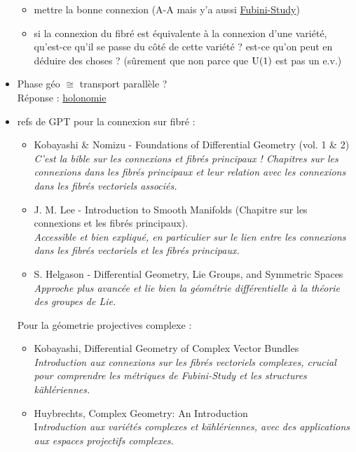 \begin{itemize}
\begin{itemize}
		\item mettre la bonne connexion (A-A mais y'a aussi  \href{https://en.wikipedia.org/wiki/Fubini%E2%80%93Study_metric}{Fubini-Study})
		
		\item si la connexion du fibré est équivalente à la connexion d'une variété, qu'est-ce qu'il se passe du côté de cette variété ? est-ce qu'on peut en déduire des choses ? (sûrement que non parce que $\text{\normalfont U}(1)$ est pas un e.v.)
	\end{itemize} 
	
	\item Phase géo $\cong$ transport parallèle ?
	\\ Réponse :
	\href{https://fr.wikipedia.org/wiki/Holonomie}{holonomie}
	
	\item refs de GPT pour la connexion sur fibré :
	\begin{itemize}
		\item Kobayashi \& Nomizu - Foundations of Differential Geometry (vol. 1 \& 2)
		\\
		\textit{C'est la bible sur les connexions et fibrés principaux ! Chapitres sur les connexions dans les fibrés principaux et leur relation avec les connexions dans les fibrés vectoriels associés.}
		
		\item J. M. Lee - Introduction to Smooth Manifolds (Chapitre sur les connexions et les fibrés principaux).
		\\
		\textit{Accessible et bien expliqué, en particulier sur le lien entre les connexions dans les fibrés vectoriels et les fibrés principaux.}
		
		\item S. Helgason - Differential Geometry, Lie Groups, and Symmetric Spaces
		\\
		\textit{Approche plus avancée et lie bien la géométrie différentielle à la théorie des groupes de Lie.}
	\end{itemize}

	Pour la géometrie projectives complexe :
	\begin{itemize}
		\item Kobayashi, Differential Geometry of Complex Vector Bundles \\
		\textit{Introduction aux connexions sur les fibrés vectoriels complexes, crucial pour comprendre les métriques de Fubini-Study et les structures kählériennes.}
		
		\item Huybrechts, Complex Geometry: An Introduction \\
		I\textit{ntroduction aux variétés complexes et kählériennes, avec des applications aux espaces projectifs complexes.}
		

\end{itemize}
\end{itemize}
